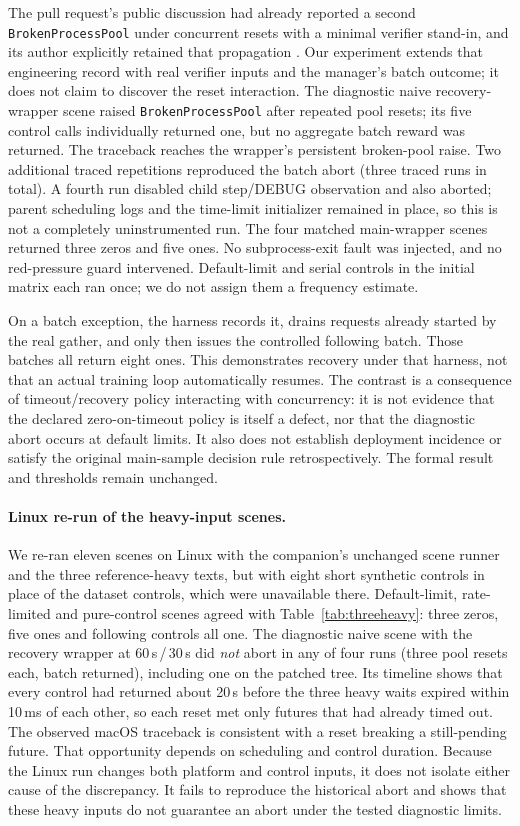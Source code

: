 \documentclass[10pt,a4paper]{article}
\let\cite\citep
\begin{document}
The pull request's public discussion had already reported a second
\texttt{BrokenProcessPool} under concurrent resets with a minimal verifier
stand-in, and its author explicitly retained that propagation
\cite{verl8015discussion}. Our experiment extends that engineering record
with real verifier inputs and the manager's batch outcome; it does not claim
to discover the reset interaction.
The diagnostic naive recovery-wrapper scene raised
\texttt{BrokenProcessPool} after repeated pool resets; its five control
calls individually returned one, but no aggregate batch reward was
returned. The traceback reaches the wrapper's persistent broken-pool
raise. Two additional traced repetitions reproduced the batch abort
(three traced runs in total). A fourth run disabled child step/DEBUG
observation and also aborted; parent scheduling logs and the time-limit
initializer remained in place, so this is not a completely uninstrumented
run. The four matched main-wrapper scenes returned three zeros and five
ones. No subprocess-exit fault was injected, and no red-pressure guard
intervened. Default-limit and serial controls in the initial matrix each
ran once; we do not assign them a frequency estimate.

On a batch exception, the harness records it, drains requests already
started by the real gather, and only then issues the controlled following
batch. Those batches all return eight ones. This demonstrates recovery
under that harness, not that an actual training loop automatically resumes.
The contrast is a consequence of timeout/recovery policy interacting with
concurrency: it is not evidence that the declared zero-on-timeout policy is
itself a defect, nor that the diagnostic abort occurs at default limits.
It also does not establish deployment incidence or satisfy the original
main-sample decision rule retrospectively. The formal result and thresholds
remain unchanged.

\paragraph{Linux re-run of the heavy-input scenes.}
We re-ran eleven scenes on Linux with the companion's unchanged scene
runner and the three reference-heavy texts, but with eight short synthetic
controls in place of the dataset controls, which were unavailable there.
Default-limit, rate-limited and pure-control scenes agreed with
Table~\ref{tab:threeheavy}: three zeros, five ones and following controls all
one. The diagnostic naive scene with the recovery wrapper at
60\,s\,/\,30\,s did \emph{not} abort in any of four runs (three pool resets
each, batch returned), including one on the patched tree. Its timeline shows
that every control had returned about 20\,s before the three heavy waits
expired within 10\,ms of each other, so each reset met only futures that had
already timed out. The observed macOS traceback is consistent with a reset breaking a
still-pending future. That opportunity depends on scheduling and control
duration. Because the Linux run changes both platform and control inputs,
it does not isolate either cause of the discrepancy. It fails to reproduce
the historical abort and shows that these heavy inputs do not guarantee
an abort under the tested diagnostic limits.
\end{document}
